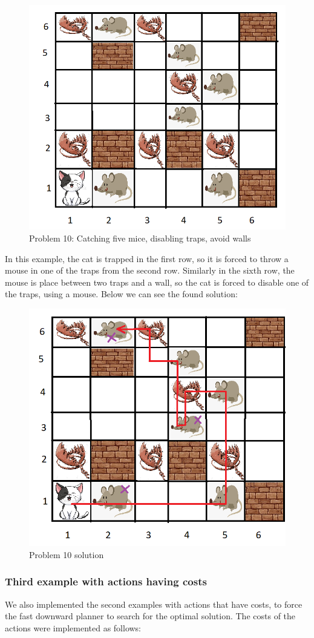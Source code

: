 \begin{figure}[ht]
    \centering
    \includegraphics[width=.5\linewidth]{fig/A3/cat_10.png}
    \caption{Problem 10: Catching five mice, disabling traps, avoid walls }
    \label{fig:cat_10}
\end{figure}

In this example, the cat is trapped in the first row, so it is forced to throw a mouse in one of the traps from the second row. Similarly in the sixth row, the mouse is place between two traps and a wall, so the cat is forced to disable one of the traps, using a mouse.
Below we can see the found solution:


\begin{figure}[ht]
    \centering
    \includegraphics[width=.5\linewidth]{fig/A3/cat_10_sol_withoutWeight.png}
    \caption{Problem 10 solution}
    \label{fig:cat_10_solution}
\end{figure}


\subsubsection{Third example with actions having costs}
We also implemented the second examples with actions that have costs, to force the fast downward planner to search for the optimal solution.
The costs of the actions were implemented as follows:



